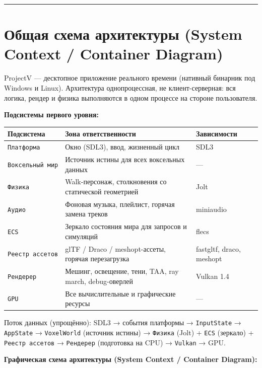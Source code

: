 
\begin{center}\rule{0.5\linewidth}{0.5pt}\end{center}

\section{Общая схема архитектуры (System Context / Container Diagram)}\label{KT-2.1_Architecture-ux43eux431ux449ux430ux44f-ux441ux445ux435ux43cux430-ux430ux440ux445ux438ux442ux435ux43aux442ux443ux440ux44b-system-context--container-diagram}

ProjectV --- десктопное приложение реального времени (нативный бинарник под Windows и Linux). Архитектура однопроцессная, не клиент-серверная: вся логика, рендер и физика выполняются в одном процессе на стороне пользователя.

\textbf{Подсистемы первого уровня:}

\begin{longtable}[]{@{}lll@{}}
\toprule\noalign{}
Подсистема & Зона ответственности & Зависимости \\
\midrule\noalign{}
\endhead
\bottomrule\noalign{}
\endlastfoot
\texttt{Платформа} & Окно (SDL3), ввод, жизненный цикл & SDL3 \\
\texttt{Воксельный\ мир} & Источник истины для всех воксельных данных & --- \\
\texttt{Физика} & Walk-персонаж, столкновения со статической геометрией & Jolt \\
\texttt{Аудио} & Фоновая музыка, плейлист, горячая замена треков & miniaudio \\
\texttt{ECS} & Зеркало состояния мира для запросов и симуляций & flecs \\
\texttt{Реестр\ ассетов} & glTF / Draco / meshopt-ассеты, горячая перезагрузка & fastgltf, draco, meshopt \\
\texttt{Рендерер} & Мешинг, освещение, тени, TAA, ray march, debug-оверлей & Vulkan 1.4 \\
\texttt{GPU} & Все вычислительные и графические ресурсы & --- \\
\end{longtable}

Поток данных (упрощённо): SDL3 → события платформы → \texttt{InputState} → \texttt{AppState} → \texttt{VoxelWorld} (источник истины) → \texttt{Физика} (Jolt) + \texttt{ECS} (зеркало) + \texttt{Реестр\ ассетов} → \texttt{Рендерер} (подготовка на CPU) → \texttt{Vulkan} → GPU.

\textbf{Графическая схема архитектуры (System Context / Container Diagram):}

